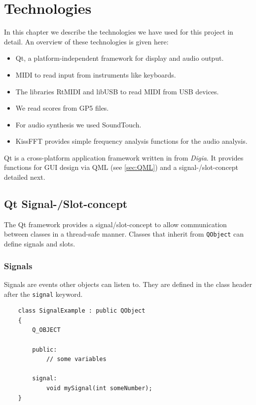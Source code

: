 \chapter{Technologies}
\label{chap:Technologies}
In this chapter we describe the technologies we have used for this project in detail. 
An overview of these technologies is given here:

\begin{itemize}
	\item Qt, a platform-independent framework for display and audio output.
	\item \gls{MIDI} to read input from instruments like keyboards.
	\item The libraries RtMIDI and libUSB to read MIDI from USB devices.
	\item We read scores from GP5 files.
	\item For audio synthesis we used SoundTouch.
	\item KissFFT provides simple frequency analysis functions for the audio analysis.
\end{itemize}

Qt is a cross-platform application framework written in \cpp from \emph{Digia}. It provides functions for GUI design via QML (see \ref{sec:QML}) and a signal-/slot-concept detailed next.

\section[Qt Signal-/Slot-concept \textsuperscript{Kugler}]{Qt Signal-/Slot-concept}
\label{sec:Signal-/Slot}

The Qt framework provides a signal/slot-concept to allow communication between classes in a thread-safe manner. Classes that inherit from {\tt QObject} can define signals and slots.

\subsection{Signals}

Signals are events other objects can listen to. 
They are defined in the class header after the {\tt signal} keyword.

\begin{lstlisting}
	class SignalExample : public QObject
	{
		Q_OBJECT
		
		public:
			// some variables
			
		signal:
			void mySignal(int someNumber);
	}
\end{lstlisting}

